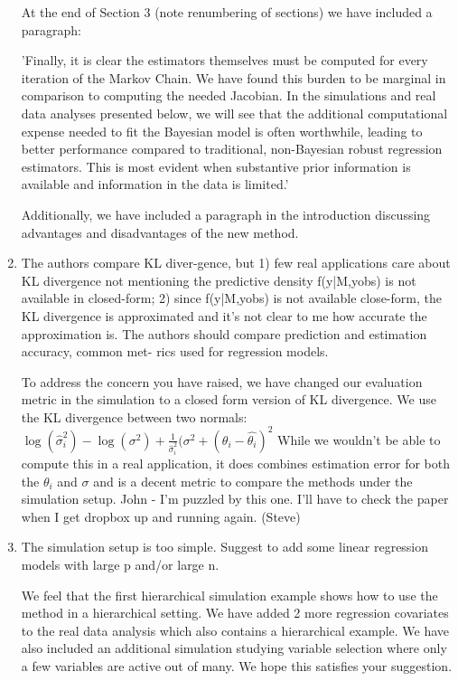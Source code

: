 \documentclass{article}
\newcommand{\response}[1]{{\color{blue}#1}}
\begin{document}
\begin{enumerate}
\response{At the end of Section 3 (note renumbering of sections) we have included a paragraph:}

\response{'Finally, it is clear the estimators themselves must be computed for every iteration of the Markov Chain. We have found this burden to be marginal in comparison to computing the needed Jacobian. In the simulations and real data analyses presented below, we will see that the additional computational expense needed to fit the Bayesian model is often worthwhile, leading to better performance compared to traditional, non-Bayesian robust regression estimators.  This is most evident when substantive prior information is available and information in the data is limited.'}

\response{Additionally, we have included a paragraph in the introduction discussing advantages and disadvantages of the new method.}

\item The authors compare KL diver-gence, but 1) few real applications care about KL divergence not mentioning the predictive density f(y|M,yobs) is not available in closed-form; 2) since f(y|M,yobs) is not available close-form, the KL divergence is approximated and it's not clear to me how accurate the approximation is.
The authors should compare prediction and estimation accuracy, common met- rics used for regression models.

\response{To address the concern you have raised, we have changed our evaluation metric in the simulation to a closed form version of KL divergence.  We use the KL divergence between two normals: $ 
\log(\hat\sigma_{i}^{2}) - \log(\sigma^{2}) + \frac{1}{\hat\sigma_{i}^{2}}(\sigma^{2} + (\theta_{i} - \hat{\theta_{i}})^{2}
$
While we wouldn't be able to compute this in a real application, it does combines estimation error for both the $\theta_{i}$ and $\sigma$ and is a decent metric to compare the methods under the simulation setup. }
John - I'm puzzled by this one.  I'll have to check the paper when I get dropbox up and running again.  (Steve)

\item The simulation setup is too simple. Suggest to add some linear regression models with large p and/or large n.

\response{We feel that the first hierarchical simulation example shows how to use the method in a hierarchical setting. We have added 2 more regression covariates to the real data analysis which also contains a hierarchical example. We have also included an additional simulation studying variable selection where only a few variables are active out of many.  We hope this satisfies your suggestion.}

\end{enumerate}
\end{document}

